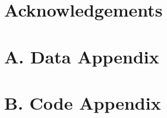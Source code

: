 \documentclass[11pt, letterpaper]{article}
\begin{document}




\section*{Acknowledgements}


\clearpage
\section*{A. Data Appendix} \label{app:Data}


\section*{B. Code Appendix} \label{app:Code}



\singlespacing


%

\end{document}
